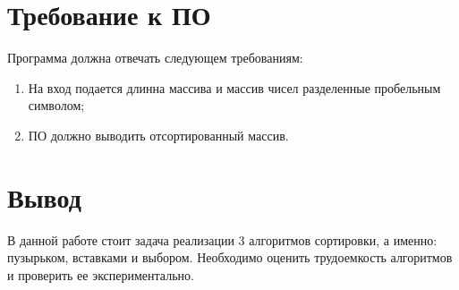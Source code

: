 \section{Требование к ПО}

Программа должна отвечать следующем требованиям:
\begin{enumerate}
	\item На вход подается длинна массива и массив чисел разделенные пробельным символом;
	\item ПО должно выводить отсортированный массив.
\end{enumerate}

\section{Вывод}
В данной работе стоит задача реализации 3 алгоритмов сортировки, а именно: пузырьком, вставками и выбором. Необходимо оценить трудоемкость алгоритмов и проверить ее экспериментально.